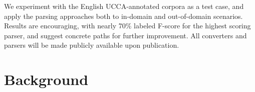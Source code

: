 \documentclass[11pt]{article}
\newcommand{\oa}[1]{\footnote{\color{red} #1}}
\newcommand{\secref}[1]{Section~\ref{#1}}
\begin{document}
We experiment with the English UCCA-annotated corpora \cite{abend2013universal}
as a test case,
and apply the parsing approaches both to in-domain and out-of-domain scenarios.
Results are encouraging, with nearly 70\% labeled F-score for the highest
scoring parser, and suggest concrete paths for further improvement.
All converters and parsers will be made publicly available upon publication.





\section{Background}\label{sec:background}
\end{document}
